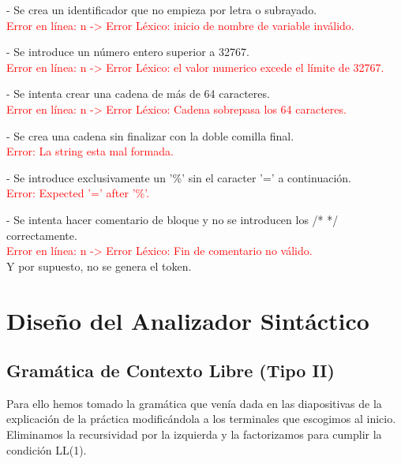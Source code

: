 \documentclass{article}[a4paper]
\newcommand\tab[1][1cm]{\hspace*{#1}}
\begin{document}
- Se crea un identificador que no empieza por letra o subrayado.\\
\tab \tab \textcolor{red}{Error en línea: n -> Error Léxico: inicio de nombre de variable inválido.}

- Se introduce un número entero superior a 32767.\\
\tab \tab \textcolor{red}{Error en línea: n -> Error Léxico: el valor numerico excede el límite de 32767.}

- Se intenta crear una cadena de más de 64 caracteres.\\
\tab \tab \textcolor{red}{Error en línea: n -> Error Léxico: Cadena sobrepasa los 64 caracteres.}

- Se crea una cadena sin finalizar con la doble comilla final.\\
\tab \tab \textcolor{red}{Error: La string esta mal formada.}

- Se introduce exclusivamente un '\%' sin el caracter '=' a continuación.\\
\tab \tab \textcolor{red}{Error: Expected '=' after '\%'.}

- Se intenta hacer comentario de bloque y no se introducen los /* */ correctamente.\\
\tab \tab \textcolor{red}{Error en línea: n -> Error Léxico: Fin de comentario no válido.}\\

Y por supuesto, no se genera el token.


\newpage

\section{Diseño del Analizador Sintáctico}
\subsection{Gramática de Contexto Libre (Tipo II)}
Para ello hemos tomado la gramática que venía dada en las diapositivas de la explicación de la práctica modificándola a los terminales que escogimos al inicio. Eliminamos la recursividad por la izquierda y la factorizamos para cumplir la condición LL(1).
\end{document}
